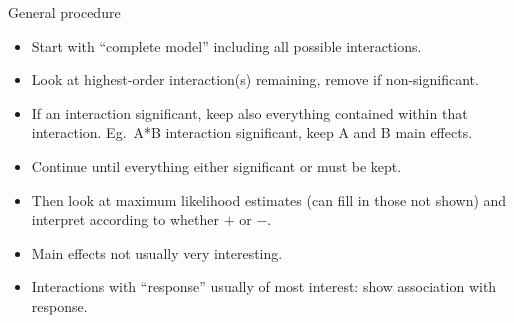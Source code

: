 \documentclass[pdf]{prosper}
\begin{document}
\begin{slide}{General procedure}
\begin{itemize}
\item Start with ``complete model'' including all possible interactions.
\item Look at highest-order interaction(s) remaining, remove if non-significant.
\item If an interaction significant, keep also everything contained within that interaction. Eg.\ A*B interaction significant, keep A and B main effects.
\item Continue until everything either significant or must be kept.
\item Then look at maximum likelihood estimates (can fill in those not shown) and interpret according to whether $+$ or $-$.
  \item Main effects not usually very interesting.
\item Interactions with ``response'' usually of most interest: show association with response.
\end{itemize}
\end{slide}
\end{document}
